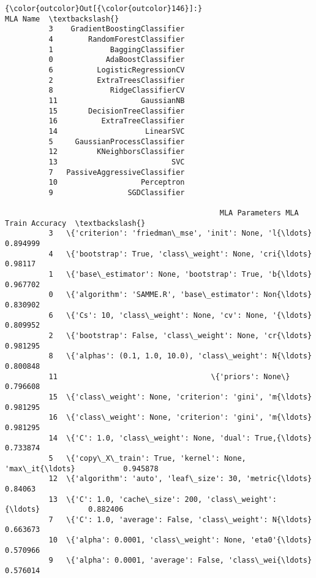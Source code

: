 \documentclass[11pt]{article}
\begin{document}
\begin{Verbatim}[commandchars=\\\{\}]
{\color{outcolor}Out[{\color{outcolor}146}]:}                        MLA Name  \textbackslash{}
          3    GradientBoostingClassifier   
          4        RandomForestClassifier   
          1             BaggingClassifier   
          0            AdaBoostClassifier   
          6          LogisticRegressionCV   
          2          ExtraTreesClassifier   
          8             RidgeClassifierCV   
          11                   GaussianNB   
          15       DecisionTreeClassifier   
          16          ExtraTreeClassifier   
          14                    LinearSVC   
          5     GaussianProcessClassifier   
          12         KNeighborsClassifier   
          13                          SVC   
          7   PassiveAggressiveClassifier   
          10                   Perceptron   
          9                 SGDClassifier   
          
                                                 MLA Parameters MLA Train Accuracy  \textbackslash{}
          3   \{'criterion': 'friedman\_mse', 'init': None, 'l{\ldots}           0.894999   
          4   \{'bootstrap': True, 'class\_weight': None, 'cri{\ldots}            0.98117   
          1   \{'base\_estimator': None, 'bootstrap': True, 'b{\ldots}           0.967702   
          0   \{'algorithm': 'SAMME.R', 'base\_estimator': Non{\ldots}           0.830902   
          6   \{'Cs': 10, 'class\_weight': None, 'cv': None, '{\ldots}           0.809952   
          2   \{'bootstrap': False, 'class\_weight': None, 'cr{\ldots}           0.981295   
          8   \{'alphas': (0.1, 1.0, 10.0), 'class\_weight': N{\ldots}           0.800848   
          11                                   \{'priors': None\}           0.796608   
          15  \{'class\_weight': None, 'criterion': 'gini', 'm{\ldots}           0.981295   
          16  \{'class\_weight': None, 'criterion': 'gini', 'm{\ldots}           0.981295   
          14  \{'C': 1.0, 'class\_weight': None, 'dual': True,{\ldots}           0.733874   
          5   \{'copy\_X\_train': True, 'kernel': None, 'max\_it{\ldots}           0.945878   
          12  \{'algorithm': 'auto', 'leaf\_size': 30, 'metric{\ldots}            0.84063   
          13  \{'C': 1.0, 'cache\_size': 200, 'class\_weight': {\ldots}           0.882406   
          7   \{'C': 1.0, 'average': False, 'class\_weight': N{\ldots}           0.663673   
          10  \{'alpha': 0.0001, 'class\_weight': None, 'eta0'{\ldots}           0.570966   
          9   \{'alpha': 0.0001, 'average': False, 'class\_wei{\ldots}           0.576014   
          

\end{Verbatim}
\end{document}
